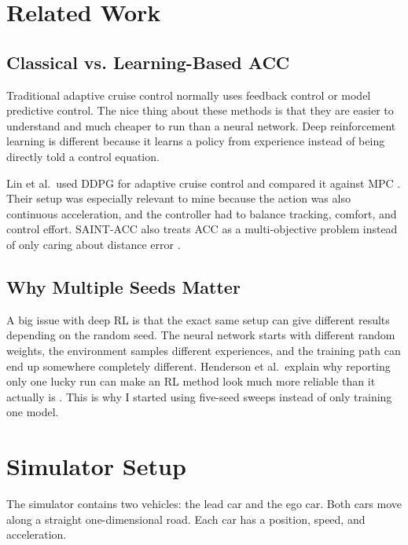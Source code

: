 \documentclass{article}
\begin{document}
\section{Related Work}

\subsection*{Classical vs. Learning-Based ACC}

Traditional adaptive cruise control normally uses feedback control or model predictive control. The nice thing about these methods is that they are easier to understand and much cheaper to run than a neural network. Deep reinforcement learning is different because it learns a policy from experience instead of being directly told a control equation.

Lin et al.\ used DDPG for adaptive cruise control and compared it against MPC \cite{lin2020comparison}. Their setup was especially relevant to mine because the action was also continuous acceleration, and the controller had to balance tracking, comfort, and control effort. SAINT-ACC also treats ACC as a multi-objective problem instead of only caring about distance error \cite{das2021saint}.

\subsection*{Why Multiple Seeds Matter}

A big issue with deep RL is that the exact same setup can give different results depending on the random seed. The neural network starts with different random weights, the environment samples different experiences, and the training path can end up somewhere completely different. Henderson et al.\ explain why reporting only one lucky run can make an RL method look much more reliable than it actually is \cite{henderson2018matters}. This is why I started using five-seed sweeps instead of only training one model.

\section{Simulator Setup}

The simulator contains two vehicles: the lead car and the ego car. Both cars move along a straight one-dimensional road. Each car has a position, speed, and acceleration.
\end{document}

